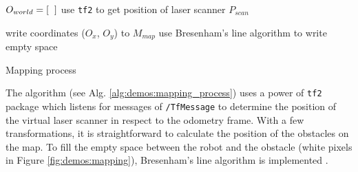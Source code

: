 \vspace*{.4cm}
\begin{algorithm}[H]

$ O_{world} = [\hspace{2mm}] $ 
use \texttt{tf2} to get position of laser scanner $ P_{scan} $\;


write coordinates ($O_{x}$, $O_{y}$) to $ M_{map} $\;
use Bresenham's line algorithm to write empty space\;

\caption{Mapping process}
\label{alg:demos:mapping_process}
\end{algorithm}
\vspace*{.4cm}

The algorithm (see Alg. \ref{alg:demos:mapping_process}) uses a power of \texttt{tf2} package which listens for messages of \texttt{/TfMessage} to determine the position of the virtual laser scanner in respect to the odometry frame.
With a few transformations, it is straightforward to calculate the position of the obstacles on the map.
To fill the empty space between the robot and the obstacle (white pixels in Figure \ref{fig:demos:mapping}), Bresenham's line algorithm is implemented \cite{borenstein_measurement_1996}.

